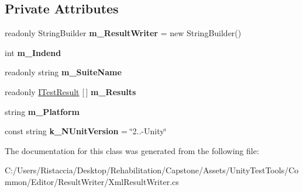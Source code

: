 \subsection*{Private Attributes}
\begin{DoxyCompactItemize}
\item 
\mbox{\label{class_unity_test_1_1_xml_result_writer_a4e0e74510ae1b33a51f5655b96768642}} 
readonly String\+Builder {\bfseries m\+\_\+\+Result\+Writer} = new String\+Builder()
\item 
\mbox{\label{class_unity_test_1_1_xml_result_writer_aae8d89e36faaba4ca45f08be8e06d67a}} 
int {\bfseries m\+\_\+\+Indend}
\item 
\mbox{\label{class_unity_test_1_1_xml_result_writer_a12445ae7faa3546b29b9a47ae84fe471}} 
readonly string {\bfseries m\+\_\+\+Suite\+Name}
\item 
\mbox{\label{class_unity_test_1_1_xml_result_writer_a01153b59faa985bfcb18dc21bac1518d}} 
readonly \hyperlink{interface_i_test_result}{I\+Test\+Result} \mbox{[}$\,$\mbox{]} {\bfseries m\+\_\+\+Results}
\item 
\mbox{\label{class_unity_test_1_1_xml_result_writer_a28ed1ab841dd61423821cbf1b9a628b7}} 
string {\bfseries m\+\_\+\+Platform}
\item 
\mbox{\label{class_unity_test_1_1_xml_result_writer_a86a2c575ed21233c5c179bbaebcb75dd}} 
const string {\bfseries k\+\_\+\+N\+Unit\+Version} = \char`\"{}2..-\/Unity\char`\"{}
\end{DoxyCompactItemize}


The documentation for this class was generated from the following file\+:\begin{DoxyCompactItemize}
\item 
C\+:/\+Users/\+Ristaccia/\+Desktop/\+Rehabilitation/\+Capstone/\+Assets/\+Unity\+Test\+Tools/\+Common/\+Editor/\+Result\+Writer/Xml\+Result\+Writer.\+cs\end{DoxyCompactItemize}
